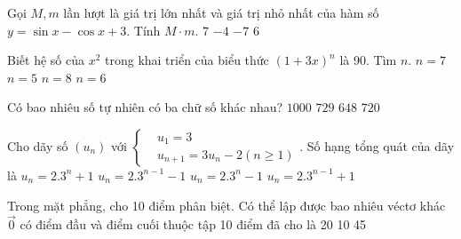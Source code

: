 \begin{ex}%
	Gọi $M,m$ lần lượt là giá trị lớn nhất và giá trị nhỏ nhất của hàm số $y=\sin x-\cos x+3 $. Tính $M\cdot m$.
	\choice
	{\True $7 $}
	{$-4 $}
	{$-7 $}
	{$6 $}
\end{ex}
\begin{ex}%
	Biết hệ số của $x^2$ trong khai triển của biểu thức $(1+3x)^n$ là 90. Tìm $n$.
	\choice
	{$n=7 $}
	{\True $n=5$}
	{$n=8 $}
	{$n=6$}
\end{ex}
\begin{ex}%
	Có bao nhiêu số tự nhiên có ba chữ số khác nhau?
	\choice
	{$1000$}
	{$729$}
	{\True $648 $}
	{$720 $}
\end{ex}
\begin{ex}%
	Cho dãy số $\left({u_n}\right)$ với $\left\{\begin{aligned}& u_1=3 \\
	& u_{n+1}=3u_n-2\left({n\geqslant 1}\right) 
	\end{aligned}\right.$. Số hạng tổng quát của dãy   là
	\choice
	{$u_n=2.3^n+1 $}
	{$u_n=2.3^{n-1}-1 $}
	{$u_n=2.3^n-1 $}
	{\True $u_n=2.3^{n-1}+1 $}
\end{ex}
\begin{ex}%
	Trong mặt phẳng, cho 10 điểm phân biệt. Có thể lập được bao nhiêu véctơ khác $\vec{0}$ có điểm đầu và điểm cuối thuộc tập 10 điểm đã cho là
	\choice
	{20}
	{10}
	{45}
	{}
\end{ex}
